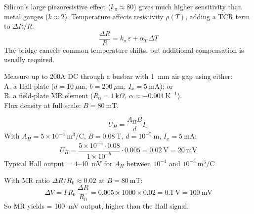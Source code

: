 

\begin{solutionblock}
Silicon’s large piezoresistive effect (\(k_\pi \approx 80\)) gives much higher sensitivity than metal gauges (\(k \approx 2\)). 
Temperature affects resistivity \(\rho(T)\), adding a TCR term to \(\Delta R/R\).
\[
\frac{\Delta R}{R} = k_\pi \, \varepsilon + \alpha_T \, \Delta T
\]
The bridge cancels common temperature shifts, but additional compensation is usually required.
\end{solutionblock}



Measure up to 200A DC through a busbar with 1~mm air gap using either:\\
A. a Hall plate (\(d = 10~\mu\text{m},~ b = 200~\mu\text{m},~ I_x = 5~\text{mA}\)); or\\ 
B. a field-plate MR element (\(R_0 = 1~\text{k}\Omega,~ \alpha \approx -0.004~\text{K}^{-1}\)).\\  
Flux density at full scale: \(B = 80~\text{mT}\).



\begin{solutionblock}
\[
U_H = \frac{A_H B}{d} I_x
\]
With \(A_H = 5\times10^{-4}\ \text{m}^3/\text{C}\), \(B = 0.08~\text{T}\), \(d = 10^{-5}~\text{m}\), \(I_x = 5~\text{mA}\):
\[
U_H = \frac{5\times10^{-4}\cdot0.08}{1\times10^{-5}}\cdot0.005 = 0.02~\text{V} = 20~\text{mV}
\]
Typical Hall output = 4–40~mV for \(A_H\) between \(10^{-4}\) and \(10^{-3}\ \text{m}^3/\text{C}\)
\end{solutionblock}




\begin{solutionblock}
With MR ratio \(\Delta R / R_0 \approx 0.02\) at \(B = 80~\text{mT}\):
\[
\Delta V = I\,R_0\,\frac{\Delta R}{R_0} = 0.005 \times 1000 \times 0.02 = 0.1~\text{V} = 100~\text{mV}
\]
So MR yields = 100~mV output, higher than the Hall signal.
\end{solutionblock}


